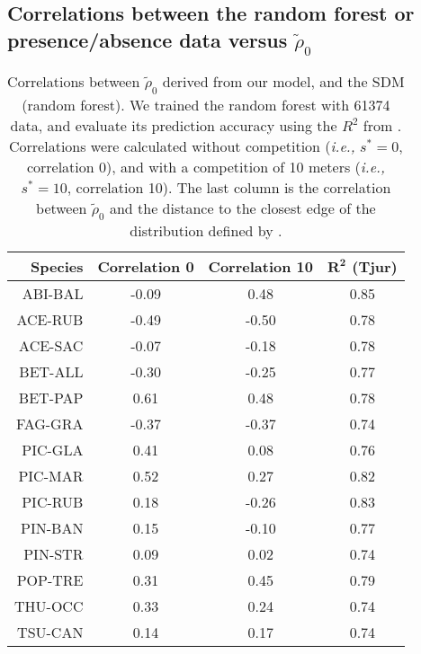 \documentclass[letterpaper, 12pt]{article}
\newcommand {\ie}{\textit{i.e., }}
\newcommand {\s}{{s}^{*}}
\theoremstyle{theo}
\begin{document}
\begin{refsection}
\begin{onehalfspace}
\subsection{Correlations between the random forest or presence/absence data versus $ \tilde \rho_0 $}
\begin{table}[!h]
\centering
\caption[Correlations $ \tilde \rho_0 $ and random forest]{Correlations between $ \tilde \rho_0 $ derived from our model, and the SDM (random forest). We trained the random forest with \num{61374} data, and evaluate its prediction accuracy using the $ R^2 $ from \citet{Tjur2009}. Correlations were calculated without competition (\ie $ \s = 0 $, correlation 0), and with a competition of 10 meters (\ie $ \s = 10 $, correlation 10). The last column is the correlation between $ \tilde \rho_0 $ and the distance to the closest edge of the distribution defined by \citet{Little1971}. \label{tab::R0correlSDM}}
\begin{tabular}{@{}rccc@{}}
	\toprule
	\textbf{Species} & \textbf{Correlation 0} & \textbf{Correlation 10} & $ \bm{R^2} $ \textbf{(Tjur)} \\
	\midrule
		ABI-BAL & -0.09 & 0.48 & 0.85 \\
		ACE-RUB & -0.49 & -0.50 & 0.78 \\
		ACE-SAC & -0.07 & -0.18 & 0.78 \\
		BET-ALL & -0.30 & -0.25 & 0.77 \\
		BET-PAP & 0.61 & 0.48 & 0.78 \\
		FAG-GRA & -0.37 & -0.37 & 0.74 \\
		PIC-GLA & 0.41 & 0.08 & 0.76 \\
		PIC-MAR & 0.52 & 0.27 & 0.82 \\
		PIC-RUB & 0.18 & -0.26 & 0.83 \\
		PIN-BAN & 0.15 & -0.10 & 0.77 \\
		PIN-STR & 0.09 & 0.02 & 0.74 \\
		POP-TRE & 0.31 & 0.45 & 0.79 \\
		THU-OCC & 0.33 & 0.24 & 0.74 \\
		TSU-CAN & 0.14 & 0.17 & 0.74 \\
	\bottomrule
\end{tabular}
\end{table}


\end{onehalfspace}
\end{refsection}
\end{document}
